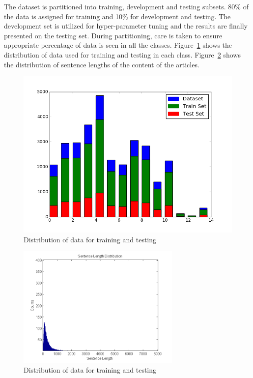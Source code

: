 \documentclass[12pt]{article}
\begin{document}

The dataset is partitioned into training, development and testing subsets. 80\% of the data is assigned for training and 10\% for development and testing. The development set is utilized for hyper-parameter tuning and the results are finally presented on the testing set. During partitioning, care is taken to ensure appropriate percentage of data is seen in all the classes. Figure~\ref{fig:dist} shows the distribution of data used for training and testing in each class. Figure~\ref{fig:sent_dist} shows the distribution of sentence lengths of the content of the articles.

\begin{figure}[h!]
\centering
\includegraphics[width=\textwidth]{figures/test_class_distribution.png}
\caption{Distribution of data for training and testing}\label{fig:dist}
\end{figure}

\begin{figure}[t]
\centering
\includegraphics[width=\textwidth,height=6cm]{figures/sentence_length.png}
\caption{Distribution of data for training and testing}\label{fig:sent_dist}
\end{figure}
\end{document}
